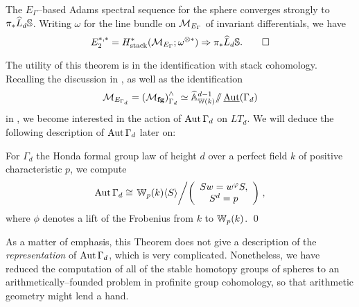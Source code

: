 \begin{theorem}
The $E_\Gamma$--based Adams spectral sequence for the sphere converges strongly to $\pi_* \widehat L_d \S$.  Writing $\omega$ for the line bundle on $\context{E_\Gamma}$ of invariant differentials, we have \[E_2^{*, *} = H^*_{\mathrm{stack}}(\context{E_\Gamma}; \omega^{\otimes *}) \Rightarrow \pi_* \widehat L_d \S. \qed\]
\end{theorem}


The utility of this theorem is in the identification with stack cohomology.  Recalling the discussion in , as well as the identification \[\context{E_{\Gamma_d}} = \left( \moduli{fg} \right)^\wedge_{\Gamma_d} \simeq \widehat{\mathbb A}^{d-1}_{\mathbb W(k)} \mmod \InternalAut(\Gamma_d)\] in , we become interested in the action of $\Aut \Gamma_d$ on $LT_d$.  We will deduce the following description of $\Aut \Gamma_d$ later on:
\begin{theorem}
For $\Gamma_d$ the Honda formal group law of height $d$ over a perfect field $k$ of positive characteristic $p$, we compute \[\Aut \Gamma_d \cong \left. \W_p(k) \<S\> \middle/ \left( \begin{array}{c} Sw = w^\phi S, \\ S^d = p \end{array} \right) \right.,\] where $\phi$ denotes a lift of the Frobenius from $k$ to $\W_p(k)$. \qed
\end{theorem}
\noindent As a matter of emphasis, this Theorem does not give a description of the \emph{representation} of $\Aut \Gamma_d$, which is very complicated.  Nonetheless, we have reduced the computation of all of the stable homotopy groups of spheres to an arithmetically--founded problem in profinite group cohomology, so that arithmetic geometry might lend a hand.

